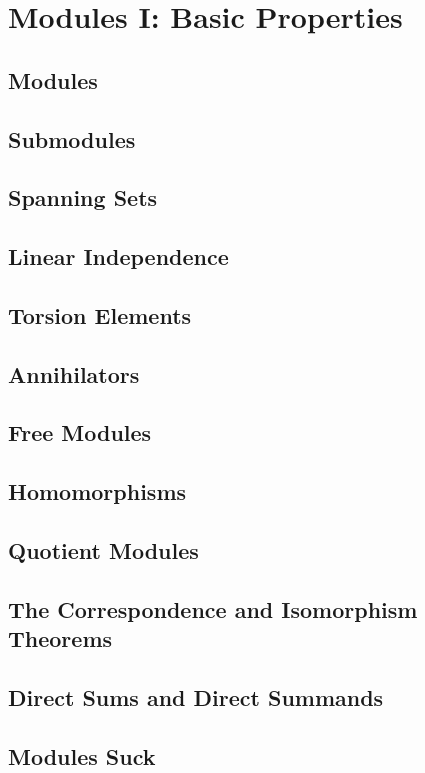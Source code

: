 \chapter{Modules I: Basic Properties}
\section{Modules}
\section{Submodules}
\section{Spanning Sets}
\section{Linear Independence}
\section{Torsion Elements}
\section{Annihilators}
\section{Free Modules}
\section{Homomorphisms}
\section{Quotient Modules}
\section{The Correspondence and Isomorphism Theorems}
\section{Direct Sums and Direct Summands}
\section{Modules Suck}
